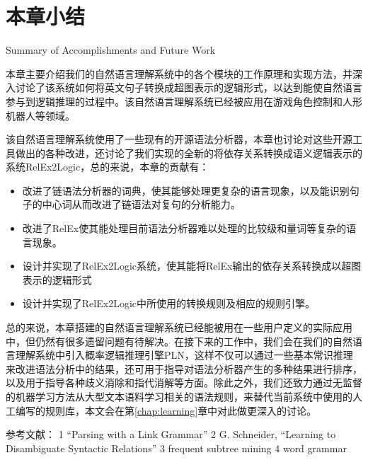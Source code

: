 \section{本章小结}{Summary of Accomplishments and Future Work}

本章主要介绍我们的自然语言理解系统中的各个模块的工作原理和实现方法，并深入讨论了该系统如何将英文句子转换成超图表示的逻辑形式，以达到能使自然语言参与到逻辑推理的过程中。该自然语言理解系统已经被应用在游戏角色控制和人形机器人等领域。

该自然语言理解系统使用了一些现有的开源语法分析器，本章也讨论对这些开源工具做出的各种改进，还讨论了我们实现的全新的将依存关系转换成语义逻辑表示的系统RelEx2Logic，总的来说，本章的贡献有：

\begin{itemize}
\item 改进了链语法分析器的词典，使其能够处理更复杂的语言现象，以及能识别句子的中心词从而改进了链语法对复句的分析能力。
\item 改进了RelEx使其能处理目前语法分析器难以处理的比较级和量词等复杂的语言现象。
\item 设计并实现了RelEx2Logic系统，使其能将RelEx输出的依存关系转换成以超图表示的逻辑形式
\item 设计并实现了RelEx2Logic中所使用的转换规则及相应的规则引擎。
\end{itemize}

总的来说，本章搭建的自然语言理解系统已经能被用在一些用户定义的实际应用中，但仍然有很多遗留问题有待解决。在接下来的工作中，我们会在我们的自然语言理解系统中引入概率逻辑推理引擎PLN，这样不仅可以通过一些基本常识推理来改进语法分析中的结果，还可用于指导对语法分析器产生的多种结果进行排序，以及用于指导各种歧义消除和指代消解等方面。除此之外，我们还致力通过无监督的机器学习方法从大型文本语料学习相关的语法规则，来替代当前系统中使用的人工编写的规则库，本文会在第\ref{chap:learning}章中对此做更深入的讨论。


参考文献：
1 “Parsing with a Link Grammar”
2 G. Schneider, ``Learning to Disambiguate Syntactic
Relations''
3 frequent subtree mining
4 word grammar
